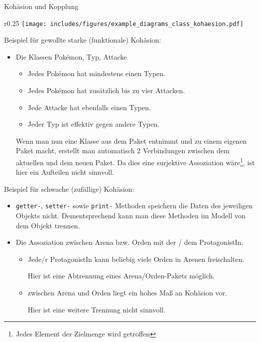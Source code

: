 \begin{example}{Kohäsion und Kopplung}
    \begin{wrapfigure}{r}{0.25\textwidth}
        \centering
        \texttt{[image: includes/figures/example\_diagrams\_class\_kohaesion.pdf]}
    \end{wrapfigure}
    Beispiel für gewollte starke (funktionale) Kohäsion:
    \begin{itemize}
        \item Die Klassen Pokémon, Typ, Attacke
              \begin{itemize}
                  \item Jedes Pokémon hat mindestens einen Typen.
                  \item Jedes Pokémon hat zusätzlich bis zu vier Attacken.
                  \item Jede Attacke hat ebenfalls einen Typen.
                  \item Jeder Typ ist effektiv gegen andere Typen.
              \end{itemize}

              Wenn man nun eine Klasse aus dem Paket entnimmt und zu einem eigenen Paket macht, erstellt man automatisch 2 Verbindungen zwischen dem aktuellen und dem neuen Paket.
              Da dies eine surjektive Assoziation wäre\footnote{Jedes Element der Zielmenge wird getroffen}, ist hier ein Aufteilen nicht sinnvoll.
    \end{itemize}

    Beispiel für schwache (zufällige) Kohäsion:
    \begin{itemize}
        \item \texttt{getter-}, \texttt{setter-} sowie \texttt{print-} Methoden speichern die Daten des jeweiligen Objekts nicht.
              Dementsprechend kann man diese Methoden im Modell von dem Objekt trennen.
        \item Die Assoziation zwischen Arena bzw. Orden mit der / dem ProtagonistIn.
              \begin{itemize}
                  \item Jede/r ProtagonistIn kann beliebig viele Orden in Arenen freischalten.

                        Hier ist eine Abtrennung eines Arena/Orden-Pakets möglich.
                  \item zwischen Arena und Orden liegt ein hohes Maß an Kohäsion vor.

                        Hier ist eine weitere Trennung nicht sinnvoll.
              \end{itemize}
    \end{itemize}
\end{example}

